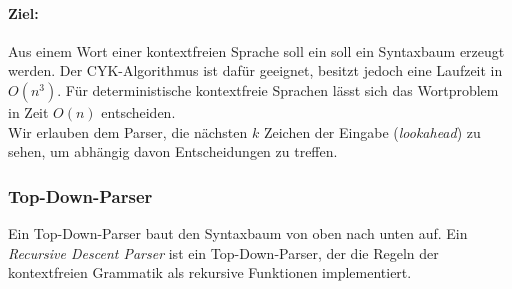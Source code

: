 \paragraph{Ziel:} Aus einem Wort einer kontextfreien Sprache soll ein soll ein Syntaxbaum erzeugt werden. Der CYK-Algorithmus ist dafür geeignet, besitzt jedoch eine Laufzeit in $O(n^3)$. Für deterministische kontextfreie Sprachen lässt sich das Wortproblem in Zeit $O(n)$ entscheiden.\\
Wir erlauben dem Parser, die nächsten $k$ Zeichen der Eingabe (\emph{lookahead}) zu sehen, um abhängig davon Entscheidungen zu treffen.

\subsubsection{Top-Down-Parser}
Ein Top-Down-Parser baut den Syntaxbaum von oben nach unten auf. Ein \emph{Recursive Descent Parser} ist ein Top-Down-Parser, der die Regeln der kontextfreien Grammatik als rekursive Funktionen implementiert.

